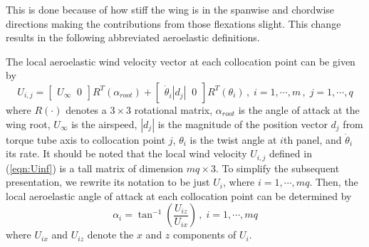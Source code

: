 \documentclass[11pt]{ucthesis}
\begin{document}
This is done because of how stiff the wing is in the spanwise and chordwise directions making the contributions from those flexations slight. This change results in the following abbreviated aeroelastic definitions.

The local aeroelastic wind velocity vector at each collocation point can be given by
\begin{equation}
U_{i,j} =\begin{bmatrix}U_{\infty} \;\; 0\end{bmatrix} R^T(\alpha_{root}) + \begin{bmatrix}\dot{\theta}_{i} |d_{j}| \;\; 0\end{bmatrix} R^T (\theta_{i}) \,,\;i=1,\cdots, m\,,\;j=1,\cdots, q
\label{eqn:Uinf}
\end{equation}
where $R(\cdot)$ denotes a $3\times 3$ rotational matrix, $\alpha_{root}$ is the angle of attack at the wing root, $U_{\infty}$ is the airspeed, $|d_{j}|$ is the magnitude of the position vector $d_{j}$ from torque tube axis to collocation point $j$, $\theta_i$ is the twist angle at $i$th panel, and $\dot{\theta}_i$ its rate. It should be noted that the local wind velocity $U_{i,j}$ defined in (\ref{eqn:Uinf}) is a tall matrix of dimension $mq \times 3$. To simplify the subsequent presentation, we rewrite its notation to be just $U_i$, where $i=1,\cdots,mq$. Then, the local aeroelastic angle of attack at each collocation point can be determined by
\begin{equation}
\alpha_{i} = \tan^{-1} \left (\frac{U_{iz}}{U_{ix}} \right) \,,\;i=1,\cdots, mq
\label{eqn:alpha_aero}
\end{equation}
where $U_{ix}$ and $U_{iz}$ denote the $x$ and $z$ components of $U_{i}$. 
\end{document}
